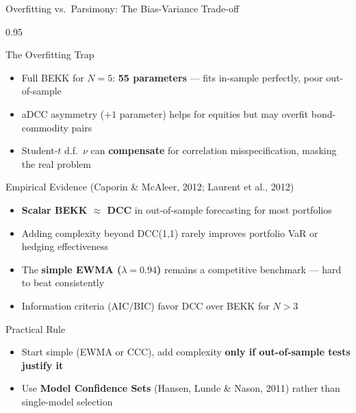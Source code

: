 \documentclass[9pt, aspectratio=169, t]{beamer}
\begin{document}
\begin{frame}{Overfitting vs.\ Parsimony: The Bias-Variance Trade-off}
    \begin{cminipage}{0.95\textwidth}
    \vspace{-2mm}
    {\scriptsize
    \begin{block}{The Overfitting Trap}
        \begin{itemize}\setlength{\itemsep}{0pt}
            \item Full BEKK for $N = 5$: \textbf{55 parameters} --- fits in-sample perfectly, poor out-of-sample
            \item aDCC asymmetry ($+1$ parameter) helps for equities but may overfit bond-commodity pairs
            \item Student-$t$ d.f.\ $\nu$ can \textbf{compensate} for correlation misspecification, masking the real problem
        \end{itemize}
    \end{block}
    \vspace{-1mm}
    \begin{block}{Empirical Evidence (Caporin \& McAleer, 2012; Laurent et al., 2012)}
        \begin{itemize}\setlength{\itemsep}{0pt}
            \item \textbf{Scalar BEKK $\approx$ DCC} in out-of-sample forecasting for most portfolios
            \item Adding complexity beyond DCC(1,1) rarely improves portfolio VaR or hedging effectiveness
            \item The \textbf{simple EWMA ($\lambda = 0.94$)} remains a competitive benchmark --- hard to beat consistently
            \item Information criteria (AIC/BIC) favor DCC over BEKK for $N > 3$
        \end{itemize}
    \end{block}
    \begin{alertblock}{Practical Rule}
        \begin{itemize}\setlength{\itemsep}{0pt}
            \item Start simple (EWMA or CCC), add complexity \textbf{only if out-of-sample tests justify it}
            \item Use \textbf{Model Confidence Sets} (Hansen, Lunde \& Nason, 2011) rather than single-model selection
        \end{itemize}
    \end{alertblock}
    }
    \end{cminipage}
\end{frame}
\end{document}
